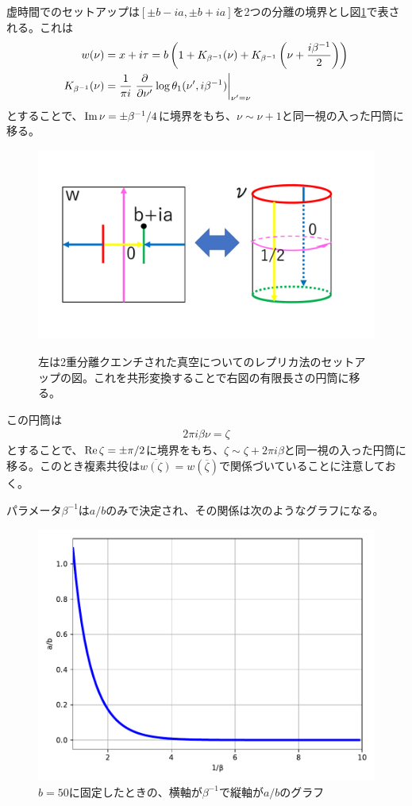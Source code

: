 虚時間でのセットアップは$[\pm b-ia,\pm b+ia]$を2つの分離の境界とし図\ref{fig:dqmapping}で表される。これは
\begin{align}
w(\nu)&=x+i\tau=b\left( 1+ K_{\beta^{-1}}(\nu)+K_{\beta^{-1}}\left(\nu+\frac{i\beta^{-1}}{2}\right) \right)\\
K_{\beta^{-1}}(\nu)&=\frac{1}{\pi i}\left.\frac{\partial}{\partial \nu'}\log\theta_1(\nu',i\beta^{-1})\right|_{\nu'=\nu}
\end{align}
とすることで、$\text{Im}\, \nu=\pm \beta^{-1}/4$に境界をもち、$\nu\sim \nu+1$と同一視の入った円筒に移る\cite{sakajo2012force}\cite{Numasawa_2016}。
\begin{figure}[h]
	\centering
	\includegraphics[width=0.7\linewidth]{DQmapping.pdf}
	\label{fig:dqmapping}
	\caption{左は2重分離クエンチされた真空についてのレプリカ法のセットアップの図。これを共形変換することで右図の有限長さの円筒に移る。}
\end{figure}

この円筒は
\begin{align}
2\pi i \beta\nu = \zeta
\end{align}
とすることで、$\text{Re}\, \zeta=\pm \pi/2$に境界をもち、$\zeta\sim \zeta+2\pi i \beta$と同一視の入った円筒に移る。このとき複素共役は$\overline{w(\zeta)}=w(\overline{\zeta})$で関係づいていることに注意しておく。

パラメータ$\beta^{-1}$は$a/b$のみで決定され、その関係は次のようなグラフになる。
\begin{figure}[h]
	\centering
	\includegraphics[width=0.5\linewidth]{s2aoverb.pdf}
	\caption{$b=50$に固定したときの、横軸が$\beta^{-1}$で縦軸が$a/b$のグラフ}
\end{figure}

